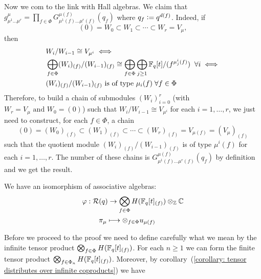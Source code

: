 Now we com to the link with Hall algebras. We claim that $g_{\mu^1\dots\mu^r}^\mu=\prod_{f\in\Phi}G_{\mu^1(f)\dots\mu^r(f)}^{\mu(f)}(q_f)$ where $q_f\bydef q^{d(f)}$. Indeed, if
\begin{equation}
      (0)=W_0\subset W_1\subset\cdots\subset W_r= V_\mu,
\end{equation}
then
\begin{equation}
\begin{split}
     &W_i/W_{i-1} \cong V_{\mu^i} \iff\\
     &\bigoplus_{f\in\Phi}(W_i)_{(f)}/(W_{i-1})_{(f)}\cong \bigoplus_{f\in \Phi}\bigoplus_{j\geq1}\mathbb{F}_q[t]/(f^{\mu_j^i(f)})\;\;\forall i\iff\\
      &(W_i)_{(f)}/(W_{i-1})_{(f)}\text{ is of type }\mu_i(f)\;\forall f\in\Phi
\end{split}
\end{equation}
Therefore, to build a chain of submodules $(W_i)_{i=0}^r$ (with $W_r=V_\mu \text{ and }W_0=(0)$) such that $W_i/W_{i-1}\cong V_{\mu^i}$ for each $i=1,\dots,r$, we just need to construct, for each $f\in\Phi$, a chain
\begin{equation}
    (0)=(W_0)_{(f)}\subset (W_1)_{(f)}\subset\cdots\subset (W_r)_{(f)}= V_{\mu(f)}=(V_\mu)_{(f)}
\end{equation}
such that the quotient module $(W_i)_{(f)}/(W_{i-1})_{(f)}$ is of type $\mu^i(f)$ for each $i=1,\dots,r$. The number of these chains is $G_{\mu^1(f)\dots\mu^r(f)}^{\mu(f)}(q_f)$ by definition and we get the result.
\begin{dang}
    \begin{theorem}\cite{jing2024characters}\label{theorem: space of characters is isomorphic to the tensor of Hall algebras}
        We have an isomorphism of associative algebras:
        \begin{equation}
        \begin{split}
           \varphi: \mathcal{R}&(q)\rightarrow \bigotimes_{f\in\Phi}H(\mathbb{F}_q[t]_{(f)})\otimes_{\mathbb{Z}}\mathbb{C}\\
            &\pi_\mu\longmapsto \otimes_{f\in \Phi}u_{\mu(f)}
        \end{split}            
        \end{equation}
    \end{theorem}
\end{dang}
Before we proceed to the proof we need to define carefully what we mean by the infinite tensor product $\bigotimes_{f\in\Phi}H(\mathbb{F}_q[t]_{(f)})$. For each $n\geq1$ we can form the finite tensor product $\bigotimes_{f\in\Phi_n}H(\mathbb{F}_q[t]_{(f)})$. Moreover, by corollary~(\ref{corollary: tensor distributes over infinite coproducts}) we have
